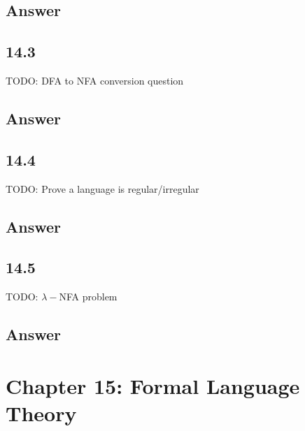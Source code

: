 \documentclass{article}
\begin{document}
\subsection*{Answer}
\newpage
\subsection*{14.3}
TODO: DFA to NFA conversion question
\subsection*{Answer}
\newpage
\subsection{14.4}
TODO: Prove a language is regular/irregular
\subsection*{Answer}
\newpage
\subsection*{14.5}
TODO: $\lambda-$NFA problem
\subsection*{Answer}
\section*{Chapter 15: Formal Language Theory}
\end{document}
